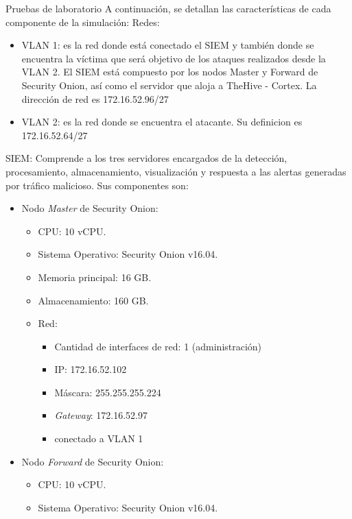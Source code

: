 \begin{section}{Pruebas de laboratorio}
    A continuación, se detallan las características de cada componente de la simulación:
    Redes:
    \begin{itemize}
        \item VLAN 1: es la red donde está conectado el SIEM y también donde se encuentra la víctima que será objetivo de los ataques realizados desde la VLAN 2. El SIEM está compuesto por los nodos Master y Forward de Security Onion, así como el servidor que aloja a TheHive - Cortex. La dirección de red es 172.16.52.96/27
        \item VLAN 2: es la red donde se encuentra el atacante. Su definicion es 172.16.52.64/27
    \end{itemize}
    SIEM:
        Comprende a los tres servidores encargados de la detección, procesamiento, almacenamiento, visualización y respuesta a las alertas generadas por tráfico malicioso. Sus componentes son:
        \begin{itemize}
            \item Nodo \textit{Master} de Security Onion: 
            \begin{itemize}
                \item CPU: 10 vCPU.
                \item Sistema Operativo: Security Onion v16.04.
                \item Memoria principal: 16 GB.
                \item Almacenamiento: 160 GB.
                \item Red:
                \begin{itemize}
                    \item Cantidad de interfaces de red: 1 (administración)
                    \item IP: 172.16.52.102
                    \item Máscara: 255.255.255.224
                    \item \textit{Gateway}: 172.16.52.97
                    \item conectado a VLAN 1
                \end{itemize}
            \end{itemize}
            \item Nodo \textit{Forward} de Security Onion: 
            \begin{itemize}
                \item CPU: 10 vCPU.
                \item Sistema Operativo: Security Onion v16.04.

\end{itemize}
\end{itemize}
\end{section}
